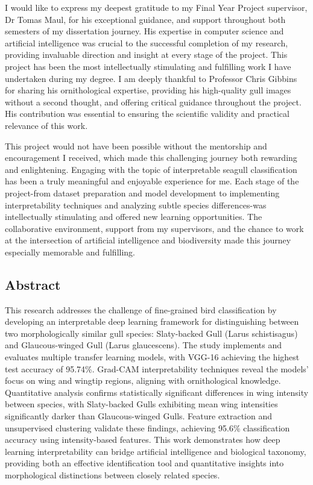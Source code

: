 \documentclass[a4paper,12pt]{report}
\begin{document}
I would like to express my deepest gratitude to my Final Year Project supervisor, Dr Tomas Maul, for his exceptional guidance, and support throughout both semesters of my dissertation journey. His expertise in computer science and artificial intelligence was crucial to the successful completion of my research, providing invaluable direction and insight at every stage of the project. This project has been the most intellectually stimulating and fulfilling work I have undertaken during my degree. I am deeply thankful to Professor Chris Gibbins for sharing his ornithological expertise, providing his high-quality gull images without a second thought, and offering critical guidance throughout the project. His contribution was essential to ensuring the scientific validity and practical relevance of this work.

This project would not have been possible without the mentorship and encouragement I received, which made this challenging journey both rewarding and enlightening. Engaging with the topic of interpretable seagull classification has been a truly meaningful and enjoyable experience for me. Each stage of the project-from dataset preparation and model development to implementing interpretability techniques and analyzing subtle species differences-was intellectually stimulating and offered new learning opportunities. The collaborative environment, support from my supervisors, and the chance to work at the intersection of artificial intelligence and biodiversity made this journey especially memorable and fulfilling.

\newpage
\begin{center}
    \section*{Abstract}
\end{center}

This research addresses the challenge of fine-grained bird classification by developing an interpretable deep learning framework for distinguishing between two morphologically similar gull species: Slaty-backed Gull (Larus schistisagus) and Glaucous-winged Gull (Larus glaucescens). The study implements and evaluates multiple transfer learning models, with VGG-16 achieving the highest test accuracy of 95.74\%. Grad-CAM interpretability techniques reveal the models' focus on wing and wingtip regions, aligning with ornithological knowledge. Quantitative analysis confirms statistically significant differences in wing intensity between species, with Slaty-backed Gulls exhibiting mean wing intensities significantly darker than Glaucous-winged Gulls. Feature extraction and unsupervised clustering validate these findings, achieving 95.6\% classification accuracy using intensity-based features. This work demonstrates how deep learning interpretability can bridge artificial intelligence and biological taxonomy, providing both an effective identification tool and quantitative insights into morphological distinctions between closely related species.
\end{document}
